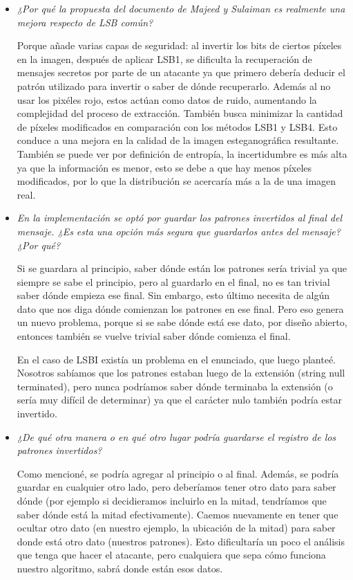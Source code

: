 \documentclass[a4paper,12pt]{article}
\begin{document}
\begin{itemize}
		
		\item \textit{¿Por qué la propuesta del documento de Majeed y Sulaiman es realmente una mejora respecto de LSB común?}
		
		Porque añade varias capas de seguridad: al invertir los bits de ciertos píxeles en la imagen, después de aplicar LSB1, se dificulta la recuperación de mensajes secretos por parte de un atacante ya que primero debería deducir el patrón utilizado para invertir o saber de dónde recuperarlo. Además al no usar los pixéles rojo, estos actúan como datos de ruido, aumentando la complejidad del proceso de extracción. También busca minimizar la cantidad de píxeles modificados en comparación con los métodos LSB1 y LSB4. Esto conduce a una mejora en la calidad de la imagen esteganográfica resultante. También se puede ver por definición de entropía, la incertidumbre es más alta ya que la información es menor, esto se debe a que hay menos píxeles modificados, por lo que la distribución se acercaría más a la de una imagen real.
		
		\newpage 
		
		\item \textit{En la implementación se optó por guardar los patrones invertidos al final del mensaje. ¿Es esta una opción más segura que guardarlos antes del mensaje? ¿Por qué?}
		
		Si se guardara al principio, saber dónde están los patrones sería trivial ya que siempre se sabe el principio, pero al guardarlo en el final, no es tan trivial saber dónde empieza ese final. Sin embargo, esto último necesita de algún dato que nos diga dónde comienzan los patrones en ese final. Pero eso genera un nuevo problema, porque si se sabe dónde está ese dato, por diseño abierto, entonces también se vuelve trivial saber dónde comienza el final.
		
		En el caso de LSBI existía un problema en el enunciado, que luego planteé. Nosotros sabíamos que los patrones estaban luego de la extensión (string null terminated), pero nunca podríamos saber dónde terminaba la extensión (o sería muy difícil de determinar) ya que el carácter nulo también podría estar invertido.
		
		\item \textit{¿De qué otra manera o en qué otro lugar podría guardarse el registro de los patrones invertidos?}
		
		Como mencioné, se podría agregar al principio o al final. Además, se podría guardar en cualquier otro lado, pero deberíamos tener otro dato para saber dónde (por ejemplo si decidieramos incluirlo en la mitad, tendríamos que saber dónde está la mitad efectivamente). Caemos nuevamente en tener que ocultar otro dato (en nuestro ejemplo, la ubicación de la mitad) para saber donde está otro dato (nuestros patrones). Esto dificultaría un poco el análisis que tenga que hacer el atacante, pero cualquiera que sepa cómo funciona nuestro algoritmo, sabrá donde están esos datos.
		

\end{itemize}
\end{document}
